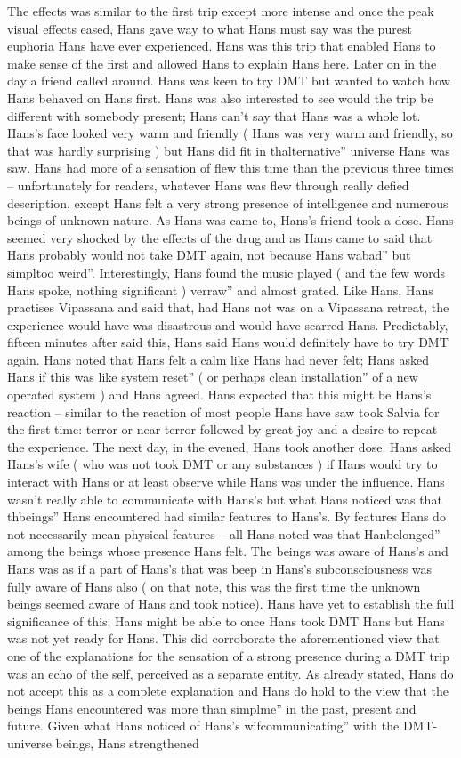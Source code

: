 \documentclass[12pt]{book}
\begin{document}
The effects was similar to the first trip except more intense and once the peak visual effects eased, Hans gave way to what Hans must say was the purest euphoria Hans have ever experienced. Hans was this trip that enabled Hans to make sense of the first and allowed Hans to explain Hans here. Later on in the day a friend called around. Hans was keen to try DMT but wanted to watch how Hans behaved on Hans first. Hans was also interested to see would the trip be different with somebody present; Hans can't say that Hans was a whole lot. Hans's face looked very warm and friendly ( Hans was very warm and friendly, so that was hardly surprising ) but Hans did fit in thalternative'' universe Hans was saw. Hans had more of a sensation of flew this time than the previous three times -- unfortunately for readers, whatever Hans was flew through really defied description, except Hans felt a very strong presence of intelligence and numerous beings of unknown nature. As Hans was came to, Hans's friend took a dose. Hans seemed very shocked by the effects of the drug and as Hans came to said that Hans probably would not take DMT again, not because Hans wabad'' but simpltoo weird''. Interestingly, Hans found the music played ( and the few words Hans spoke, nothing significant ) verraw'' and almost grated. Like Hans, Hans practises Vipassana and said that, had Hans not was on a Vipassana retreat, the experience would have was disastrous and would have scarred Hans. Predictably, fifteen minutes after said this, Hans said Hans would definitely have to try DMT again. Hans noted that Hans felt a calm like Hans had never felt; Hans asked Hans if this was like system reset'' ( or perhaps clean installation'' of a new operated system ) and Hans agreed. Hans expected that this might be Hans's reaction -- similar to the reaction of most people Hans have saw took Salvia for the first time: terror or near terror followed by great joy and a desire to repeat the experience. The next day, in the evened, Hans took another dose. Hans asked Hans's wife ( who was not took DMT or any substances ) if Hans would try to interact with Hans or at least observe while Hans was under the influence. Hans wasn't really able to communicate with Hans's but what Hans noticed was that thbeings'' Hans encountered had similar features to Hans's. By features Hans do not necessarily mean physical features -- all Hans noted was that Hanbelonged'' among the beings whose presence Hans felt. The beings was aware of Hans's and Hans was as if a part of Hans's that was beep in Hans's subconsciousness was fully aware of Hans also ( on that note, this was the first time the unknown beings seemed aware of Hans and took notice). Hans have yet to establish the full significance of this; Hans might be able to once Hans took DMT Hans but Hans was not yet ready for Hans. This did corroborate the aforementioned view that one of the explanations for the sensation of a strong presence during a DMT trip was an echo of the self, perceived as a separate entity. As already stated, Hans do not accept this as a complete explanation and Hans do hold to the view that the beings Hans encountered was more than simplme'' in the past, present and future. Given what Hans noticed of Hans's wifcommunicating'' with the DMT-universe beings, Hans strengthened 
\end{document}
